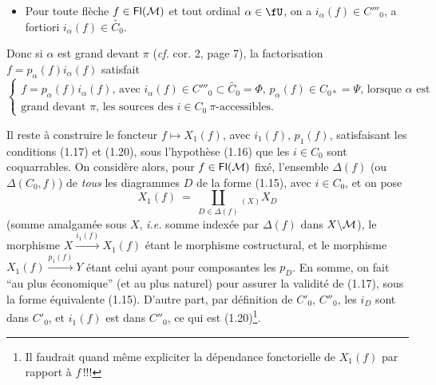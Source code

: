 \begin{itemize}[leftmargin=5em, labelwidth=4em, labelsep=1em, align=left]
\item[(1.21)] \qquad Pour toute flèche $f \in \mathsf{Fl}(\mathcal{M})$ et tout ordinal $\alpha \in \fU$, on a $i_\alpha(f) \in C'''_0$, a fortiori $i_\alpha(f) \in \widetilde{C_0}$.
\end{itemize}

Donc si $\alpha$ est grand devant $\pi$ (\textit{cf.} cor. 2, page 7), la factorisation $f = p_\alpha(f)i_\alpha(f)$ satisfait
\[
\left\{
\begin{array}{l}
f = p_\alpha(f)i_\alpha(f)\text{, avec } i_\alpha(f) \in C'''_0 \subset \widetilde{C_0} = \Phi \text{, } p_\alpha(f) \in C_{0*} = \Psi \text{, lorsque } \alpha \text{ est}\\
\text{grand devant } \pi\text{, les sources des } i \in C_0 \ \pi\text{-accessibles.}
\end{array}
\right.
\tag*{(1.22)}
\]

Il reste à construire le foncteur $f \longmapsto X_1(f)$, avec $i_1(f)$, $p_1(f)$, satisfaisant les conditions (1.17) et (1.20), sous l'hypothèse (1.16) que les $i \in C_0$ sont coquarrables. On considère alors, pour $f \in \mathsf{Fl}(\mathcal{M})$ fixé, l'ensemble $\Delta(f)$ (ou $\Delta(C_0, f)$) de \textit{tous} les diagrammes $D$ de la forme (1.15), avec $i \in C_0$, et on pose
\[
X_1(f) \ = \ \coprod_{D \in \Delta(f)}{}_{(X)} X_D
\tag*{(1.23)}
\]
(somme amalgamée sous $X$, \textit{i.e.} somme indexée
par $\Delta(f)$ dans $X\backslash\mathcal{M}$), le morphisme $X \xrightarrow{i_1(f)} X_1(f)$ étant le morphisme costructural, et le morphisme $X_1(f) \xrightarrow{p_1(f)} Y$ étant celui ayant pour composantes les $p_D$. En somme, on fait “au plus économique” (et au plus naturel) pour assurer la validité de (1.17), sous la forme équivalente (1.15). D'autre part, par définition de $C'_0$, $C''_0$, les $i_D$ sont dans $C'_0$, et $i_1(f)$ est dans $C''_0$, ce qui est (1.20)\footnote{Il faudrait quand même expliciter la dépendance fonctorielle de $X_1(f)$ par rapport à $f$\,!!!}.

